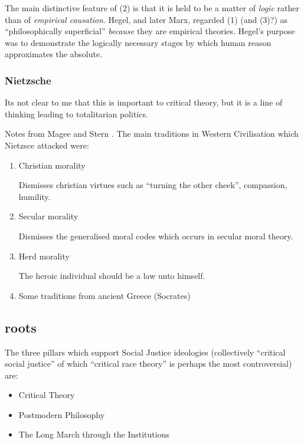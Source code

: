 \documentclass[10pt,titlepage]{book}
\begin{document}
The main distinctive feature of (2) is that it is held to be a matter of \emph{logic} rather than of \emph{empirical causation}.
Hegel, and later Marx, regarded (1) (and (3)?) as ``philosophically superficial'' \emph{because} they are empirical theories.
Hegel's purpose was to demonstrate the logically necessary stages by which human reason approximates the absolute.

\subsubsection{Nietzsche}

Its not clear to me that this is important to critical theory, but it is a line of thinking leading to totalitarian politics.

Notes from Magee and Stern \cite{magee-stern}.
The main traditions in Western Civilisation which Nietzsce attacked were:

\begin{enumerate}
  
\item Christian morality

Dismisses christian virtues such as ``turning the other cheek'', compassion, humility.
  
\item Secular morality

Dismisses the generalised moral codes which occurs in secular moral theory.

\item Herd morality

The heroic individual should be a law unto himself.
  
\item Some traditions from ancient Greece (Socrates)
  
\end{enumerate}


\subsection{roots}

The three pillars which support Social Justice ideologies (collectively ``critical social justice'' of which ``critical race theory'' is perhaps the most controversial) are:

\begin{itemize}
\item Critical Theory
\item Postmodern Philosophy
\item The Long March through the Institutions
\end{itemize}
\end{document}
